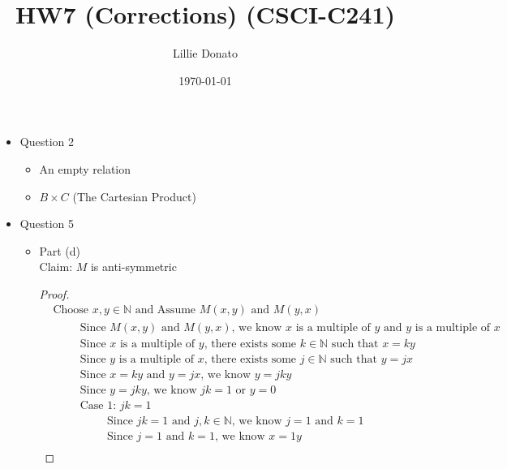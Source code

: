 \documentclass{article}
\title{HW7 (Corrections) (CSCI-C241)}
\author{Lillie Donato}
\date{\today}
\begin{document}
\maketitle

\begin{itemize}
    \item Question 2
    \begin{itemize}
        \item An empty relation
        \item $B \times C$ (The Cartesian Product)
    \end{itemize}
    \item Question 5
    \begin{itemize}
        \item Part (d) \\
        Claim: $M$ is anti-symmetric
        \begin{proof}
            \begin{align}
                &\text{Choose } x,y \in \mathbb{N} \text{ and Assume } M(x,y) \text{ and } M(y,x) \\
                &\hspace{1cm} \text{Since } M(x,y) \text{ and } M(y,x) \text{, we know } x \text{ is a multiple of } y \text{ and } y \text{ is a multiple of } x \\
                &\hspace{1cm} \text{Since } x \text{ is a multiple of } y \text{, there exists some } k \in \mathbb{N} \text{ such that } x = ky \\
                &\hspace{1cm} \text{Since } y \text{ is a multiple of } x \text{, there exists some } j \in \mathbb{N} \text{ such that } y = jx \\
                &\hspace{1cm} \text{Since } x = ky \text{ and } y = jx \text{, we know } y = jky \\
                &\hspace{1cm} \text{Since } y=jky \text{, we know } jk=1 \text{ or } y=0 \\
                &\hspace{1cm} \text{Case 1: } jk=1 \\
                &\hspace{2cm} \text{Since } jk = 1 \text{ and } j,k \in \mathbb{N} \text{, we know } j = 1 \text{ and } k = 1 \\
                &\hspace{2cm} \text{Since } j = 1 \text{ and } k = 1 \text{, we know } x = 1y \\

\end{align}
\end{proof}
\end{itemize}
\end{itemize}
\end{document}
